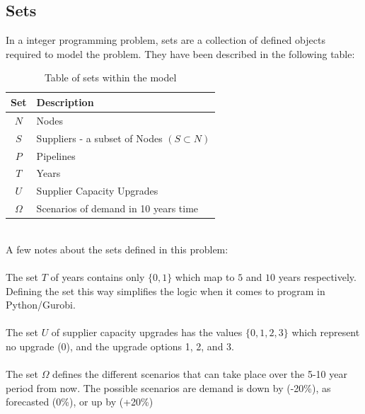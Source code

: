 \documentclass{article}
\begin{document}
\subsection{Sets}
\bigskip
In a integer programming problem, sets are a collection of defined objects required to model the problem. They have been described in the following table:\\
\bigskip
\renewcommand\baselinestretch{1.5}
\begin{table}[htb]
    \centering
    \color{black}
    \begin{tabular}{|c:l|}
        \hline
        \textbf{Set} & \textbf{Description} \\
        \hline
        \(N\) & Nodes \\ \hdashline
        \(S\) & Suppliers - a subset of Nodes \((S\subset N)\)\\ \hdashline
        \(P\) & Pipelines\\ \hdashline
        \(T\) & Years\\ \hdashline
        \(U\) & Supplier Capacity Upgrades \\ \hdashline
        \(\Omega\) & Scenarios of demand in 10 years time \\
        \hline
    \end{tabular}
    \caption{Table of sets within the model}
    \label{tab:sets}
\end{table}
\renewcommand\baselinestretch{1}\\

\noindent
A few notes about the sets defined in this problem:\\
\\
The set \(T\) of years contains only \(\{0,1\}\) which map to \(5\) and \(10\) years respectively. Defining the set this way simplifies the logic when it comes to program in Python/Gurobi. \\
\\
The set \(U\) of supplier capacity upgrades has the values \(\{0,1,2,3\}\) which represent no upgrade (0), and the upgrade options 1, 2, and 3. \\
\\
The set \(\Omega\) defines the different scenarios that can take place over the 5-10 year period from now. The possible scenarios are demand is down by (-20\%), as forecasted (0\%), or up by (+20\%)

\bigskip
\end{document}
